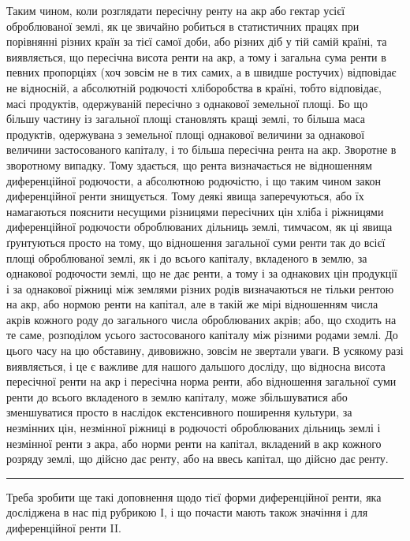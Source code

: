Таким чином, коли розглядати пересічну ренту на акр або гектар усієї
оброблюваної землі, як це звичайно робиться в статистичних працях при порівнянні
різних країн за тієї самої доби, або різних діб у тій самій країні, та
виявляється, що пересічна висота ренти на акр, а тому і загальна сума ренти
в певних пропорціях (хоч зовсім не в тих самих, а в швидше ростучих) відповідає
не відносній, а абсолютній родючості хліборобства в країні, тобто відповідає,
масі продуктів, одержуваній пересічно з однакової земельної площі. Бо що
більшу частину із загальної площі становлять кращі землі, то більша маса
продуктів, одержувана з земельної площі однакової величини за однакової величини
застосованого капіталу, і то більша пересічна рента на акр. Зворотне в зворотному
випадку. Тому здається, що рента визначається не відношенням диференційної
родючости, а абсолютною родючістю, і що таким чином закон диференційної
ренти знищується. Тому деякі явища заперечуються, або їх намагаються
пояснити несущими різницями пересічних цін хліба і ріжницями диференційної
родючости оброблюваних дільниць землі, тимчасом, як ці явища ґрунтуються
просто на тому, що відношення загальної суми ренти так до всієї площі оброблюваної
землі, як і до всього капіталу, вкладеного в землю, за однакової родючости
землі, що не дає ренти, а тому і за однакових цін продукції і за
однакової ріжниці між землями різних родів визначаються не тільки рентою
на акр, або нормою ренти на капітал, але в такій же мірі відношенням числа
акрів кожного роду до загального числа оброблюваних акрів; або, що сходить
на те саме, розподілом усього застосованого капіталу між різними родами землі.
До цього часу на цю обставину, дивовижно, зовсім не звертали уваги. В усякому
разі виявляється, і це є важливе для нашого дальшого досліду, що відносна
висота пересічної ренти на акр і пересічна норма ренти, або відношення
загальної суми ренти до всього вкладеного в землю капіталу, може збільшуватися
або зменшуватися просто в наслідок екстенсивного поширення культури,
за незмінних цін, незмінної ріжниці в родючості оброблюваних дільниць землі
і незмінної ренти з акра, або норми ренти на капітал, вкладений в акр
кожного розряду землі, що дійсно дає ренту, або на ввесь капітал, що дійсно
дає ренту.

\pfbreak

Треба зробити ще такі доповнення щодо тієї форми диференційної ренти,
яка досліджена в нас під рубрикою І, і що почасти мають також значіння і
для диференційної ренти II.

